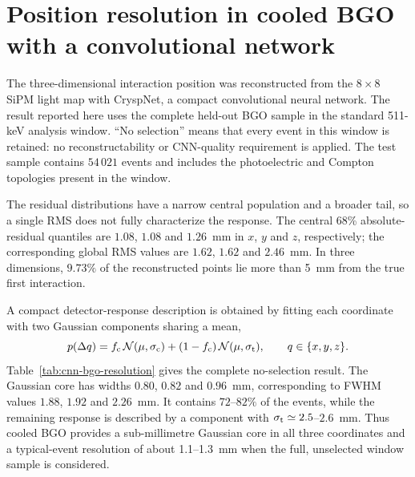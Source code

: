%
%
%

\providecommand{\cnnbgofigdir}{../analysis/results/cnn/cnn_bgo_win}
\providecommand{\cnncode}[1]{\texttt{#1}}
\providecommand{\cnnpath}[1]{\path{#1}}


\section{Position resolution in cooled BGO with a convolutional network}
\label{sec:cnn-bgo}

The three-dimensional interaction position was reconstructed from the
$8\times8$ SiPM light map with CryspNet, a compact convolutional neural network.
The result reported here uses the complete held-out BGO sample in the standard
511-keV analysis window. ``No selection'' means that every event in this window
is retained: no reconstructability or CNN-quality requirement is applied. The
test sample contains $54\,021$ events and includes the photoelectric and Compton
topologies present in the window.

The residual distributions have a narrow central population and a broader tail,
so a single RMS does not fully characterize the response. The central 68\%
absolute-residual quantiles are $1.08$, $1.08$ and $1.26$~mm in $x$, $y$ and
$z$, respectively; the corresponding global RMS values are $1.62$, $1.62$ and
$2.46$~mm. In three dimensions, $9.73\%$ of the reconstructed points lie more
than 5~mm from the true first interaction.

A compact detector-response description is obtained by fitting each coordinate
with two Gaussian components sharing a mean,
\begin{equation}
  p(\Delta q) = f_{\rm c}\,
  \mathcal{N}(\mu,\sigma_{\rm c})
  + (1-f_{\rm c})\,
  \mathcal{N}(\mu,\sigma_{\rm t}),
  \qquad q\in\{x,y,z\}.
  \label{eq:cnn-bgo-two-gauss}
\end{equation}
Table~\ref{tab:cnn-bgo-resolution} gives the complete no-selection result. The
Gaussian core has widths $0.80$, $0.82$ and $0.96$~mm, corresponding to FWHM
values $1.88$, $1.92$ and $2.26$~mm. It contains $72$--$82\%$ of the events,
while the remaining response is described by a component with
$\sigma_{\rm t}\simeq2.5$--$2.6$~mm. Thus cooled BGO provides a sub-millimetre
Gaussian core in all three coordinates and a typical-event resolution of about
1.1--1.3~mm when the full, unselected window sample is considered.

